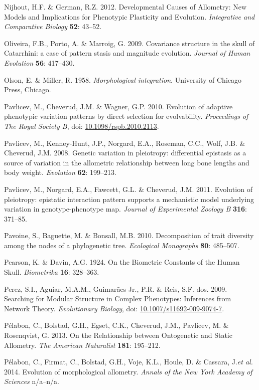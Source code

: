 \documentclass[12pt,twoside]{report}
\begin{document}
Nijhout, H.F. \& German, R.Z. 2012. Developmental Causes of Allometry:
New Models and Implications for Phenotypic Plasticity and Evolution.
\emph{Integrative and Comparative Biology} \textbf{52}: 43--52.

Oliveira, F.B., Porto, A. \& Marroig, G. 2009. Covariance structure in
the skull of Catarrhini: a case of pattern stasis and magnitude
evolution. \emph{Journal of Human Evolution} \textbf{56}: 417--430.

Olson, E. \& Miller, R. 1958. \emph{Morphological integration}.
University of Chicago Press, Chicago.

Pavlicev, M., Cheverud, J.M. \& Wagner, G.P. 2010. Evolution of adaptive
phenotypic variation patterns by direct selection for evolvability.
\emph{Proceedings of The Royal Society B}, doi:
\href{http://dx.doi.org/10.1098/rspb.2010.2113}{10.1098/rspb.2010.2113}.

Pavlicev, M., Kenney-Hunt, J.P., Norgard, E.A., Roseman, C.C., Wolf,
J.B. \& Cheverud, J.M. 2008. Genetic variation in pleiotropy:
differential epistasis as a source of variation in the allometric
relationship between long bone lengths and body weight. \emph{Evolution}
\textbf{62}: 199--213.

Pavlicev, M., Norgard, E.A., Fawcett, G.L. \& Cheverud, J.M. 2011.
Evolution of pleiotropy: epistatic interaction pattern supports a
mechanistic model underlying variation in genotype-phenotype map.
\emph{Journal of Experimental Zoology B} \textbf{316}: 371--85.

Pavoine, S., Baguette, M. \& Bonsall, M.B. 2010. Decomposition of trait
diversity among the nodes of a phylogenetic tree. \emph{Ecological
Monographs} \textbf{80}: 485--507.

Pearson, K. \& Davin, A.G. 1924. On the Biometric Constants of the Human
Skull. \emph{Biometrika} \textbf{16}: 328--363.

Perez, S.I., Aguiar, M.A.M., Guimarães Jr., P.R. \& Reis, S.F. dos.
2009. Searching for Modular Structure in Complex Phenotypes: Inferences
from Network Theory. \emph{Evolutionary Biology}, doi:
\href{http://dx.doi.org/10.1007/s11692-009-9074-7}{10.1007/s11692-009-9074-7}.

Pélabon, C., Bolstad, G.H., Egset, C.K., Cheverud, J.M., Pavlicev, M. \&
Rosenqvist, G. 2013. On the Relationship between Ontogenetic and Static
Allometry. \emph{The American Naturalist} \textbf{181}: 195--212.

Pélabon, C., Firmat, C., Bolstad, G.H., Voje, K.L., Houle, D. \&
Cassara, J.\emph{et al.} 2014. Evolution of morphological allometry.
\emph{Annals of the New York Academy of Sciences} n/a--n/a.
\end{document}
